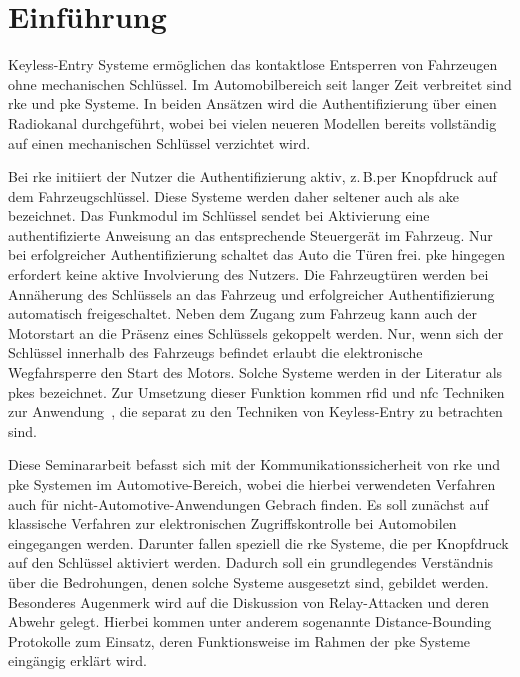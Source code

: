 \chapter{Einführung}

\foreignlanguage{english}{Keyless-Entry} Systeme ermöglichen das kontaktlose Entsperren von Fahrzeugen ohne mechanischen Schlüssel. Im Automobilbereich seit langer Zeit verbreitet sind \gls{rke} und \gls{pke} Systeme. In beiden Ansätzen wird die Authentifizierung über einen Radiokanal durchgeführt, wobei bei vielen neueren Modellen bereits vollständig auf einen mechanischen Schlüssel verzichtet wird.

Bei \gls{rke} initiiert der Nutzer die Authentifizierung aktiv, z.\,B.\@ per Knopfdruck auf dem Fahrzeugschlüssel. Diese Systeme werden daher seltener auch als \gls{ake} bezeichnet. Das Funkmodul im Schlüssel sendet bei Aktivierung eine authentifizierte Anweisung an das entsprechende Steuergerät im Fahrzeug. Nur bei erfolgreicher Authentifizierung schaltet das Auto die Türen frei. \gls{pke} hingegen erfordert keine aktive Involvierung des Nutzers. Die Fahrzeugtüren werden bei Annäherung des Schlüssels an das Fahrzeug und erfolgreicher Authentifizierung automatisch freigeschaltet. Neben dem Zugang zum Fahrzeug kann auch der Motorstart an die Präsenz eines Schlüssels gekoppelt werden. Nur, wenn sich der Schlüssel innerhalb des Fahrzeugs befindet erlaubt die elektronische Wegfahrsperre den Start des Motors. Solche Systeme werden in der Literatur als \gls{pkes} bezeichnet. Zur Umsetzung dieser Funktion kommen \gls{rfid} und \gls{nfc} Techniken zur Anwendung~\cite{Rainer2010}, die separat zu den Techniken von \foreignlanguage{english}{Keyless-Entry} zu betrachten sind.

Diese Seminararbeit befasst sich mit der Kommunikationssicherheit von \gls{rke} und \gls{pke} Systemen im Automotive-Bereich, wobei die hierbei verwendeten Verfahren auch für nicht-Automotive-Anwendungen Gebrach finden. Es soll zunächst auf klassische Verfahren zur elektronischen Zugriffskontrolle bei Automobilen eingegangen werden. Darunter fallen speziell die \gls{rke} Systeme, die per Knopfdruck auf den Schlüssel aktiviert werden. Dadurch soll ein grundlegendes Verständnis über die Bedrohungen, denen solche Systeme ausgesetzt sind, gebildet werden. Besonderes Augenmerk wird auf die Diskussion von \foreignlanguage{english}{Relay}-Attacken und deren Abwehr gelegt. Hierbei kommen unter anderem sogenannte \foreignlanguage{english}{Distance-Bounding} Protokolle zum Einsatz, deren Funktionsweise im Rahmen der \gls{pke} Systeme eingängig erklärt wird.
